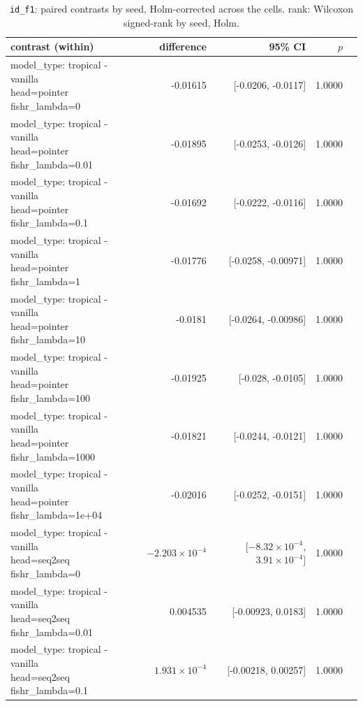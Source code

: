 \documentclass[10pt]{article}
\makeatletter
\newcommand{\stackcell}[1]{\begin{tabular}[t]{@{}l@{}}#1\end{tabular}}
\makeatother
\begin{document}
{\small
\begin{longtable}{lrrrl}
\caption{\texttt{id\_f1}: paired contrasts by seed, Holm-corrected across the cells. rank: Wilcoxon signed-rank by seed, Holm.}\label{tab:paired-id_f1}\\
\toprule
contrast (within) & difference & 95\% CI & $p$ & \\
\midrule
\endhead
\stackcell{model\_type: tropical - vanilla\\\footnotesize head=pointer fishr\_lambda=0 } & -0.01615 & [-0.0206, -0.0117] & 1.0000 & \\
\stackcell{model\_type: tropical - vanilla\\\footnotesize head=pointer fishr\_lambda=0.01 } & -0.01895 & [-0.0253, -0.0126] & 1.0000 & \\
\stackcell{model\_type: tropical - vanilla\\\footnotesize head=pointer fishr\_lambda=0.1 } & -0.01692 & [-0.0222, -0.0116] & 1.0000 & \\
\stackcell{model\_type: tropical - vanilla\\\footnotesize head=pointer fishr\_lambda=1 } & -0.01776 & [-0.0258, -0.00971] & 1.0000 & \\
\stackcell{model\_type: tropical - vanilla\\\footnotesize head=pointer fishr\_lambda=10 } & -0.0181 & [-0.0264, -0.00986] & 1.0000 & \\
\stackcell{model\_type: tropical - vanilla\\\footnotesize head=pointer fishr\_lambda=100 } & -0.01925 & [-0.028, -0.0105] & 1.0000 & \\
\stackcell{model\_type: tropical - vanilla\\\footnotesize head=pointer fishr\_lambda=1000 } & -0.01821 & [-0.0244, -0.0121] & 1.0000 & \\
\stackcell{model\_type: tropical - vanilla\\\footnotesize head=pointer fishr\_lambda=1e+04 } & -0.02016 & [-0.0252, -0.0151] & 1.0000 & \\
\stackcell{model\_type: tropical - vanilla\\\footnotesize head=seq2seq fishr\_lambda=0 } & $-2.203\times10^{-4}$ & [$-8.32\times10^{-4}$, $3.91\times10^{-4}$] & 1.0000 & \\
\stackcell{model\_type: tropical - vanilla\\\footnotesize head=seq2seq fishr\_lambda=0.01 } & 0.004535 & [-0.00923, 0.0183] & 1.0000 & \\
\stackcell{model\_type: tropical - vanilla\\\footnotesize head=seq2seq fishr\_lambda=0.1 } & $1.931\times10^{-4}$ & [-0.00218, 0.00257] & 1.0000 & \\

\end{longtable}}
\end{document}
